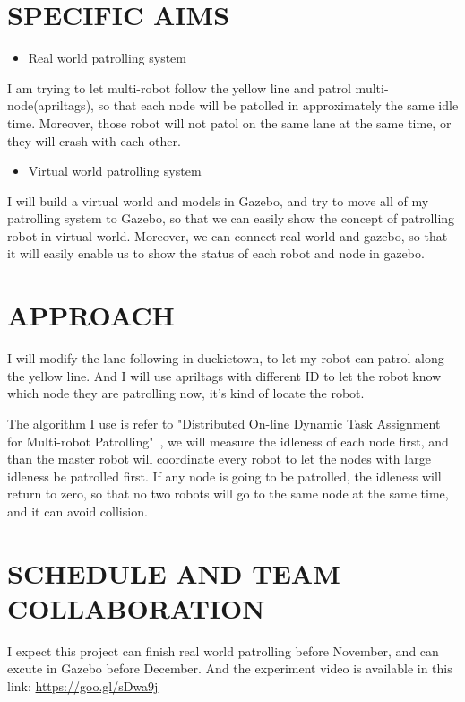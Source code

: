 \documentclass[letterpaper, 10 pt, conference]{ieeeconf}  %
\begin{document}
\section{SPECIFIC AIMS}

\begin{itemize}
\item Real world patrolling system
\end{itemize}
I am trying to let multi-robot follow the yellow line and patrol multi-node(apriltags), so that each node will be patolled in approximately the same idle time. Moreover, those robot will not patol on the same lane at the same time, or they will crash with each other.
\begin{itemize}
\item Virtual world patrolling system
\end{itemize}
I will build a virtual world and models in Gazebo, and try to move all of my patrolling system to Gazebo, so that we can easily show the concept of patrolling robot in virtual world. Moreover, we can connect real world and gazebo, so that it will easily enable us to show the status of each robot and node in gazebo.

\section{APPROACH}

I will modify the lane following in duckietown, to let my robot can patrol along the yellow line. And I will use apriltags with different ID to let the robot know which node they are patrolling now, it's kind of locate the robot.

The algorithm I use is refer to "Distributed On-line Dynamic Task Assignment for Multi-robot Patrolling"~\cite{Farinelli:2017:DOD:3124264.3124274}, we will measure the idleness of each node first, and than the master robot will coordinate every robot to let the nodes with large idleness be patrolled first. If any node is going to be patrolled, the idleness will return to zero, so that no two robots will go to the same node at the same time, and it can avoid collision.   


\section{SCHEDULE AND TEAM COLLABORATION}

I expect this project can finish real world patrolling before November, and can excute in Gazebo before December. And the experiment video is available in this link: \url{https://goo.gl/sDwa9j}

\addtolength{\textheight}{-12cm}   %



\end{document}
